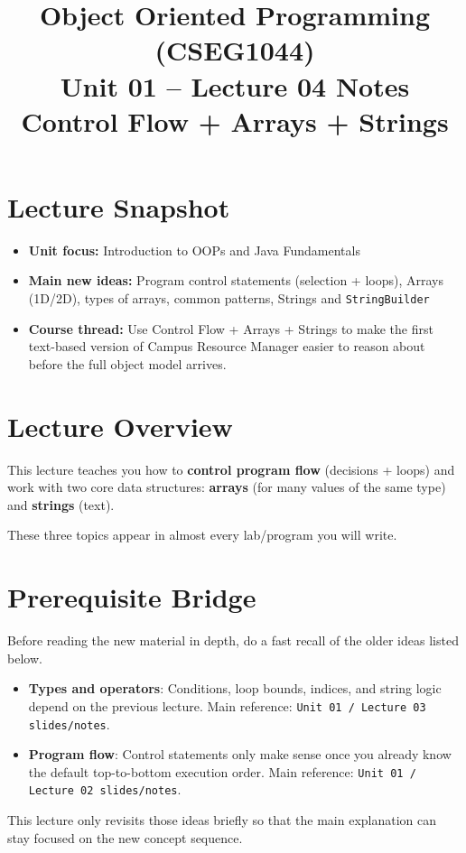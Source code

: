 \documentclass[11pt]{article}
\title{Object Oriented Programming (CSEG1044)\\Unit 01 -- Lecture 04 Notes\\Control Flow + Arrays + Strings}
\begin{document}
\maketitle
\tableofcontents

\section{Lecture Snapshot}
\begin{itemize}
  \item \textbf{Unit focus:} Introduction to OOPs and Java Fundamentals
  \item \textbf{Main new ideas:} Program control statements (selection + loops), Arrays (1D/2D), types of arrays, common patterns, Strings and \texttt{StringBuilder}
  \item \textbf{Course thread:} Use Control Flow + Arrays + Strings to make the first text-based version of Campus Resource Manager easier to reason about before the full object model arrives.
\end{itemize}
\notesources{\OOPSUnitISources}

\section{Lecture Overview}
This lecture teaches you how to \textbf{control program flow} (decisions + loops) and work with two core data structures:
\textbf{arrays} (for many values of the same type) and \textbf{strings} (text).

These three topics appear in almost every lab/program you will write.
\notesources{\OOPSUnitISources}

\section{Prerequisite Bridge}
Before reading the new material in depth, do a fast recall of the older ideas listed below.
\begin{itemize}
  \item \textbf{Types and operators}: Conditions, loop bounds, indices, and string logic depend on the previous lecture. Main reference: \texttt{Unit 01 / Lecture 03 slides/notes}.
  \item \textbf{Program flow}: Control statements only make sense once you already know the default top-to-bottom execution order. Main reference: \texttt{Unit 01 / Lecture 02 slides/notes}.
\end{itemize}
This lecture only revisits those ideas briefly so that the main explanation can stay focused on the new concept sequence.
\notesources{\OOPSUnitISources}
\end{document}

